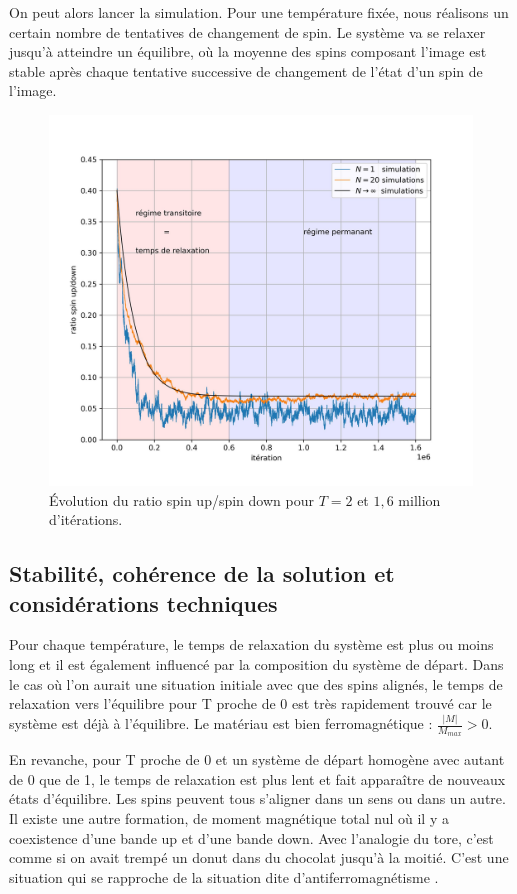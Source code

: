 \documentclass[11pt, parskip=half]{scrartcl} %
\begin{document}
On peut alors lancer la simulation. Pour une température fixée, nous réalisons un certain nombre de tentatives de changement de spin. Le système va se relaxer jusqu'à atteindre un équilibre, où la moyenne des spins composant l'image est stable après chaque tentative successive de changement de l'état d'un spin de l'image.

\begin{figure}[h]
	\centering
	\includegraphics[width=0.5\linewidth]{./figures/simulation_ising.jpg}
	\caption{Évolution du ratio spin up/spin down pour $T=2$ et $1,6$ million d'itérations.}
	\label{fig:H}
\end{figure}

\subsection{Stabilité, cohérence de la solution et considérations techniques}

Pour chaque température, le temps de relaxation du système est plus ou moins long et il est également influencé par la composition du système de départ. Dans le cas où l'on aurait une situation initiale avec que des spins alignés, le temps de relaxation vers l'équilibre pour T proche de 0 est très rapidement trouvé car le système est déjà à l'équilibre. Le matériau est bien ferromagnétique : $\frac{|M|}{M_{max}} > 0$.

En revanche, pour T proche de 0 et un système de départ homogène avec autant de 0 que de 1, le temps de relaxation est plus lent et fait apparaître de nouveaux états d'équilibre. Les spins peuvent tous s'aligner dans un sens ou dans un autre. Il existe une autre formation, de moment magnétique total nul où il y a coexistence d'une bande up et d'une bande down. Avec l'analogie du tore, c'est comme si on avait trempé un donut dans du chocolat jusqu'à la moitié. C'est une situation qui se rapproche de la situation dite d'antiferromagnétisme \cite{ferromag}.
\end{document}
